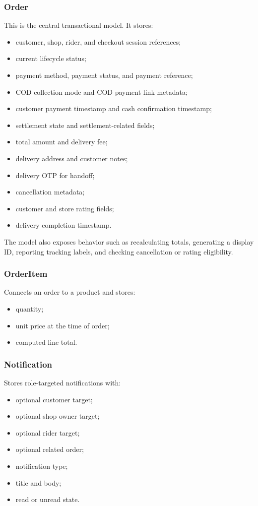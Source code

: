 \documentclass[12pt,a4paper]{article}
\begin{document}
\subsubsection{Order}
This is the central transactional model. It stores:
\begin{itemize}[leftmargin=1.5em]
    \item customer, shop, rider, and checkout session references;
    \item current lifecycle status;
    \item payment method, payment status, and payment reference;
    \item COD collection mode and COD payment link metadata;
    \item customer payment timestamp and cash confirmation timestamp;
    \item settlement state and settlement-related fields;
    \item total amount and delivery fee;
    \item delivery address and customer notes;
    \item delivery OTP for handoff;
    \item cancellation metadata;
    \item customer and store rating fields;
    \item delivery completion timestamp.
\end{itemize}

The model also exposes behavior such as recalculating totals, generating a display ID, reporting tracking labels, and checking cancellation or rating eligibility.

\subsubsection{OrderItem}
Connects an order to a product and stores:
\begin{itemize}[leftmargin=1.5em]
    \item quantity;
    \item unit price at the time of order;
    \item computed line total.
\end{itemize}

\subsubsection{Notification}
Stores role-targeted notifications with:
\begin{itemize}[leftmargin=1.5em]
    \item optional customer target;
    \item optional shop owner target;
    \item optional rider target;
    \item optional related order;
    \item notification type;
    \item title and body;
    \item read or unread state.
\end{itemize}
\end{document}
